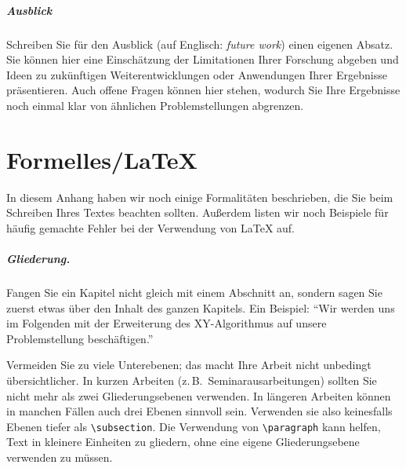 \documentclass[bachelor,german]{info1thesis}
\begin{document}
\paragraph{Ausblick} Schreiben Sie für den Ausblick (auf Englisch: \emph{future work}) einen eigenen Absatz. 
Sie können hier eine Einschätzung der Limitationen Ihrer Forschung abgeben und Ideen zu zukünftigen Weiterentwicklungen oder Anwendungen Ihrer Ergebnisse präsentieren.
Auch offene Fragen können hier stehen, wodurch Sie Ihre Ergebnisse noch einmal klar von ähnlichen Problemstellungen abgrenzen.


\thesisbibliography




\appendix


\chapter{Formelles/LaTeX}
In diesem Anhang haben wir noch einige Formalitäten beschrieben, die Sie beim
Schreiben Ihres Textes beachten sollten.
Außerdem listen wir noch Beispiele für häufig gemachte Fehler bei der
Verwendung von \LaTeX{} auf.

\paragraph{Gliederung.} Fangen Sie ein Kapitel nicht gleich mit einem
Abschnitt an, sondern sagen Sie zuerst etwas über den Inhalt des ganzen
Kapitels.
Ein Beispiel: "`Wir werden uns im Folgenden mit der Erweiterung des XY-Algorithmus auf unsere Problemstellung beschäftigen."'

Vermeiden Sie zu viele Unterebenen; das macht Ihre Arbeit nicht unbedingt
übersichtlicher.
In kurzen Arbeiten (z.\,B.\ Seminarausarbeitungen) sollten Sie nicht mehr als
zwei Gliederungsebenen verwenden.
In längeren Arbeiten können in manchen Fällen auch drei Ebenen sinnvoll sein.
Verwenden sie also keinesfalls Ebenen tiefer als \verb+\subsection+.
Die Verwendung von \verb+\paragraph+ kann helfen, Text in kleinere Einheiten zu gliedern, ohne eine eigene Gliederungsebene verwenden zu müssen.
\end{document}
